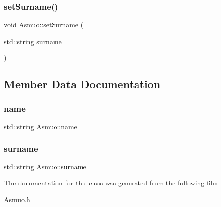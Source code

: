 \subsubsection{\texorpdfstring{setSurname()}{setSurname()}}
{\footnotesize\ttfamily void Asmuo\+::set\+Surname (\begin{DoxyParamCaption}\item[{std\+::string}]{surname }\end{DoxyParamCaption})\hspace{0.3cm}{\ttfamily [inline]}}



\subsection{Member Data Documentation}
\mbox{\label{class_asmuo_a78835e723a931acc1516881492028da1}} 
\subsubsection{\texorpdfstring{name}{name}}
{\footnotesize\ttfamily std\+::string Asmuo\+::name\hspace{0.3cm}{\ttfamily [protected]}}

\mbox{\label{class_asmuo_a557691d78c03a3817bc6256fd56efcb6}} 
\subsubsection{\texorpdfstring{surname}{surname}}
{\footnotesize\ttfamily std\+::string Asmuo\+::surname\hspace{0.3cm}{\ttfamily [protected]}}



The documentation for this class was generated from the following file\+:\begin{DoxyCompactItemize}
\item 
\mbox{\hyperlink{_asmuo_8h}{Asmuo.\+h}}\end{DoxyCompactItemize}
